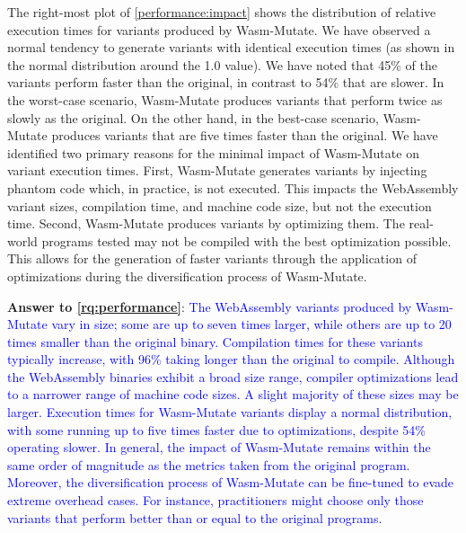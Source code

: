 \documentclass[a4paper,fleqn]{cas-dc}
\newcommand{\tool}{{\sc Wasm-Mutate}\xspace}
\newcommand{\Wasm}{WebAssembly\xspace}
\newenvironment{revision1}{\color{blue}}{}
\newcommand{\revision}[1]{\textcolor{blue}{#1}}
\begin{document}
\begin{revision1}
The right-most plot of \autoref{performance:impact} shows the distribution of relative execution times for variants produced by \tool.
We have observed a normal tendency to generate variants with identical execution times (as shown in the normal distribution around the 1.0 value).
We have noted that 45\% of the variants perform faster than the original, in contrast to 54\% that are slower.
In the worst-case scenario, \tool produces variants that perform twice as slowly as the original.
On the other hand, in the best-case scenario, \tool produces variants that are five times faster than the original.
We have identified two primary reasons for the minimal impact of \tool on variant execution times.
First, \tool generates variants by injecting phantom code which, in practice, is not executed.
This impacts the \Wasm variant sizes, compilation time, and machine code size, but not the execution time.
Second, \tool produces variants by optimizing them.
The real-world programs tested may not be compiled with the best optimization possible.
This allows for the generation of faster variants through the application of optimizations during the diversification process of \tool.






\begin{tcolorbox}[boxrule=1pt,arc=.3em,boxsep=-1.3mm]
  \textbf{Answer to \ref{rq:performance}}: 
    \revision{
    The \Wasm variants produced by \tool vary in size; some are up to seven times larger, while others are up to 20 times smaller than the original binary. 
    Compilation times for these variants typically increase, with 96\% taking longer than the original to compile. 
    Although the \Wasm binaries exhibit a broad size range, compiler optimizations lead to a narrower range of machine code sizes. 
    A slight majority of these sizes may be larger. 
    Execution times for \tool variants display a normal distribution, with some running up to five times faster due to optimizations, despite 54\% operating slower. 
    In general, the impact of \tool remains within the same order of magnitude as the metrics taken from the original program. 
    Moreover, the diversification process of \tool can be fine-tuned to evade extreme overhead cases. 
    For instance, practitioners might choose only those variants that perform better than or equal to the original programs.
    }
\end{tcolorbox}

\end{revision1}
\end{document}
